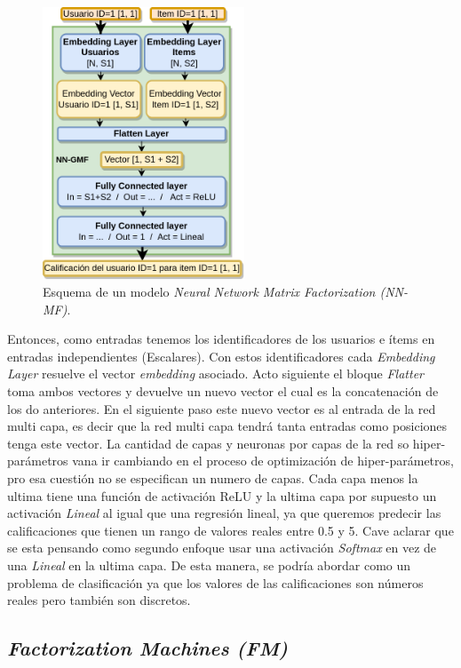 \documentclass[11pt,a4paper,twoside]{thesis}
\begin{document}
\begin{figure}[h!]
	\centering
	\includegraphics[width=6cm]{./images/NN-MF.png}

	\caption{
		Esquema de un modelo \textit{Neural Network Matrix Factorization (NN-MF)}.
	}
	\label{fig:NNMFModel}
\end{figure}

Entonces, como entradas tenemos los identificadores de los usuarios e ítems en
entradas independientes (Escalares). Con estos identificadores cada
\textit{Embedding Layer} resuelve el vector \textit{embedding} asociado. Acto
siguiente el bloque \textit{Flatter} toma ambos vectores y devuelve un nuevo
vector el cual es la concatenación de los do anteriores. En el siguiente paso
este nuevo vector es al entrada de la red multi capa, es decir que la red multi
capa tendrá tanta entradas como posiciones tenga este vector. La cantidad de
capas y neuronas por capas de la red so hiper-parámetros vana ir cambiando en
el proceso de optimización de hiper-parámetros, pro esa cuestión no se
especifican un numero de capas. Cada capa menos la ultima tiene una función de
activación ReLU y la ultima capa por supuesto un activación \textit{Lineal} al
igual que una regresión lineal, ya que queremos predecir las calificaciones que
tienen un rango de valores reales entre 0.5 y 5. Cave aclarar que se esta
pensando como segundo enfoque usar una activación \textit{Softmax} en vez de
una \textit{Lineal} en la ultima capa. De esta manera, se podría abordar como
un problema de clasificación ya que los valores de las calificaciones son
números reales pero también son discretos.

\clearpage

\subsection{\textit{Factorization Machines (FM)}}
\end{document}
